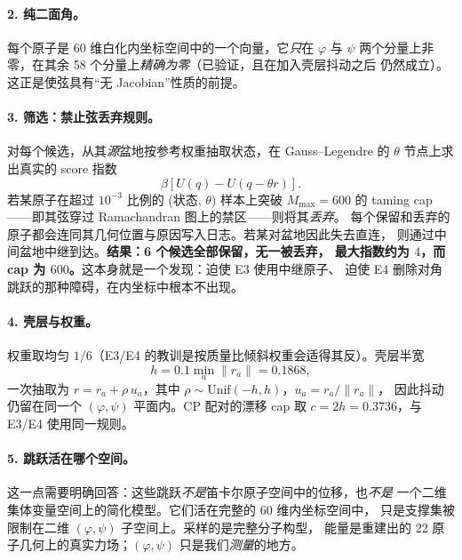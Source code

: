 \documentclass[11pt,a4paper]{article}
\begin{document}
\paragraph{2. 纯二面角。}
每个原子是 60 维白化内坐标空间中的一个向量，它\emph{只}在 $\varphi$ 与 $\psi$
两个分量上非零，在其余 58 个分量上\emph{精确为零}（已验证，且在加入壳层抖动之后
仍然成立）。这正是使弦具有“无 Jacobian”性质的前提。

\paragraph{3. 筛选：禁止弦丢弃规则。}
对每个候选，从其\emph{源}盆地按参考权重抽取状态，在 Gauss--Legendre 的 $\theta$
节点上求出真实的 score 指数
\begin{equation}
 \beta\left[U(q)-U(q-\theta r)\right].
\end{equation}
若某原子在超过 $10^{-3}$ 比例的 (状态, $\theta$) 样本上突破 $M_{\max}=600$ 的
taming cap——即其弦穿过 Ramachandran 图上的禁区——则将其\emph{丢弃}。
每个保留和丢弃的原子都会连同其几何位置与原因写入日志。若某对盆地因此失去直连，
则通过中间盆地中继到达。\textbf{结果：6 个候选全部保留，无一被丢弃，
最大指数约为 $4$，而 cap 为 $600$。}这本身就是一个发现：迫使 E3 使用中继原子、
迫使 E4 删除对角跳跃的那种障碍，在内坐标中根本不出现。

\paragraph{4. 壳层与权重。}
权重取均匀 $1/6$（E3/E4 的教训是按质量比倾斜权重会适得其反）。壳层半宽
\begin{equation}
 h=0.1\min_a\|r_a\|=0.1868,
\end{equation}
一次抽取为 $r=r_a+\rho\,u_a$，其中 $\rho\sim\mathrm{Unif}(-h,h)$，$u_a=r_a/\|r_a\|$，
因此抖动仍留在同一个 $(\varphi,\psi)$ 平面内。CP 配对的漂移 cap 取
$c=2h=0.3736$，与 E3/E4 使用同一规则。

\paragraph{5. 跳跃活在哪个空间。}
这一点需要明确回答：这些跳跃\emph{不是}笛卡尔原子空间中的位移，也\emph{不是}
一个二维集体变量空间上的简化模型。它们活在完整的 60 维内坐标空间中，
只是支撑集被限制在二维 $(\varphi,\psi)$ 子空间上。采样的是完整分子构型，
能量是重建出的 22 原子几何上的真实力场；$(\varphi,\psi)$ 只是我们\emph{测量}的地方。
\end{document}
